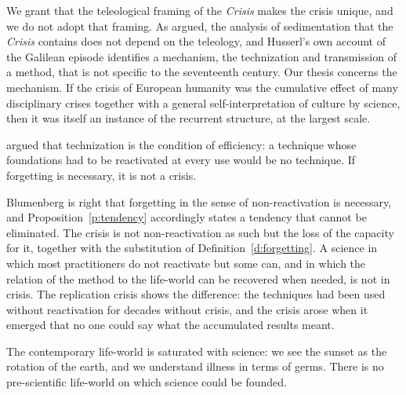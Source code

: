 \documentclass{situationist-preprint}
\begin{document}
\begin{reply}
We grant that the teleological framing of the \emph{Crisis} makes the crisis unique, and we do not adopt that framing. As \citet{Carr1974} argued, the analysis of sedimentation that the \emph{Crisis} contains does not depend on the teleology, and Husserl's own account of the Galilean episode identifies a mechanism, the technization and transmission of a method, that is not specific to the seventeenth century. Our thesis concerns the mechanism. If the crisis of European humanity was the cumulative effect of many disciplinary crises together with a general self-interpretation of culture by science, then it was itself an instance of the recurrent structure, at the largest scale.
\end{reply}

\begin{objection}
\citet{Blumenberg1981} argued that technization is the condition of efficiency: a technique whose foundations had to be reactivated at every use would be no technique. If forgetting is necessary, it is not a crisis.
\end{objection}

\begin{reply}
Blumenberg is right that forgetting in the sense of non-reactivation is necessary, and Proposition~\ref{p:tendency} accordingly states a tendency that cannot be eliminated. The crisis is not non-reactivation as such but the loss of the capacity for it, together with the substitution of Definition~\ref{d:forgetting}. A science in which most practitioners do not reactivate but some can, and in which the relation of the method to the life-world can be recovered when needed, is not in crisis. The replication crisis shows the difference: the techniques had been used without reactivation for decades without crisis, and the crisis arose when it emerged that no one could say what the accumulated results meant.
\end{reply}

\begin{objection}
The contemporary life-world is saturated with science: we see the sunset as the rotation of the earth, and we understand illness in terms of germs. There is no pre-scientific life-world on which science could be founded.
\end{objection}
\end{document}
